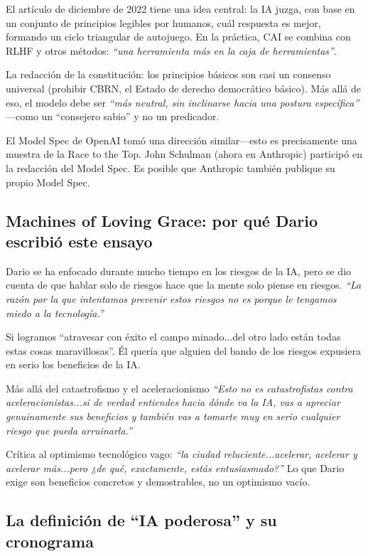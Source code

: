 El artículo de diciembre de 2022 tiene una idea central: la IA juzga, con base en un conjunto de principios legibles por humanos, cuál respuesta es mejor, formando un ciclo triangular de autojuego. En la práctica, CAI se combina con RLHF y otros métodos: \textit{``una herramienta más en la caja de herramientas''}.

La redacción de la constitución: los principios básicos son casi un consenso universal (prohibir CBRN, el Estado de derecho democrático básico). Más allá de eso, el modelo debe ser \textit{``más neutral, sin inclinarse hacia una postura específica''} —como un ``consejero sabio'' y no un predicador.

El Model Spec de OpenAI tomó una dirección similar—esto es precisamente una muestra de la Race to the Top. John Schulman (ahora en Anthropic) participó en la redacción del Model Spec. Es posible que Anthropic también publique su propio Model Spec.

\subsection{Machines of Loving Grace: por qué Dario escribió este ensayo}

Dario se ha enfocado durante mucho tiempo en los riesgos de la IA, pero se dio cuenta de que hablar solo de riesgos hace que la mente solo piense en riesgos. \textit{``La razón por la que intentamos prevenir estos riesgos no es porque le tengamos miedo a la tecnología.''}

Si logramos ``atravesar con éxito el campo minado...del otro lado están todas estas cosas maravillosas''. Él quería que alguien del bando de los riesgos expusiera en serio los beneficios de la IA.

\begin{importantbox}{Más allá del catastrofismo y el aceleracionismo}
\textit{``Esto no es catastrofistas contra aceleracionistas...si de verdad entiendes hacia dónde va la IA, vas a apreciar genuinamente sus beneficios y también vas a tomarte muy en serio cualquier riesgo que pueda arruinarla.''}

Crítica al optimismo tecnológico vago: \textit{``la ciudad reluciente...acelerar, acelerar y acelerar más...pero ¿de qué, exactamente, estás entusiasmado?''} Lo que Dario exige son beneficios concretos y demostrables, no un optimismo vacío.
\end{importantbox}

\subsection{La definición de ``IA poderosa'' y su cronograma}

